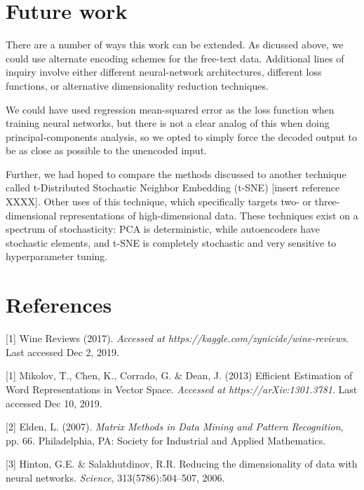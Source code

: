 \documentclass{article}
\begin{document}
\section{Future work}

There are a number of ways this work can be extended. As dicussed above, we could use alternate encoding schemes for the free-text data. Additional lines of inquiry involve either different neural-network architectures, different loss functions, or alternative dimensionality reduction techniques.

We could have used regression mean-squared error as the loss function when training neural networks, but there is not a clear analog of this when doing principal-components analysis, so we opted to simply force the decoded output to be as close as possible to the unencoded input.

Further, we had hoped to compare the methods discussed to another technique called t-Distributed Stochastic Neighbor Embedding (t-SNE) [insert reference XXXX]. Other uses of this technique, which specifically targets two- or three-dimensional representations of high-dimensional data. These techniques exist on a spectrum of stochasticity: PCA is deterministic, while autoencoders have stochastic elements, and t-SNE is completely stochastic and very sensitive to hyperparameter tuning.

\section*{References}
\small

[1] Wine Reviews (2017). {\it Accessed at https://kaggle.com/zynicide/wine-reviews}. Last accessed Dec 2, 2019.

[1] Mikolov, T., Chen, K., Corrado, G. \& Dean, J. (2013) Efficient Estimation of Word Representations in Vector Space. {\it Accessed at https://arXiv:1301.3781}. Last accessed Dec 10, 2019.

[2] Elden, L. (2007). {\it Matrix Methods in Data Mining and Pattern Recognition}, pp. 66. Philadelphia, PA:  Society for Industrial and Applied Mathematics.

[3] Hinton, G.E. \& Salakhutdinov, R.R. Reducing the dimensionality of data with neural networks. {\it Science}, 313(5786):504–507, 2006.


\end{document}
